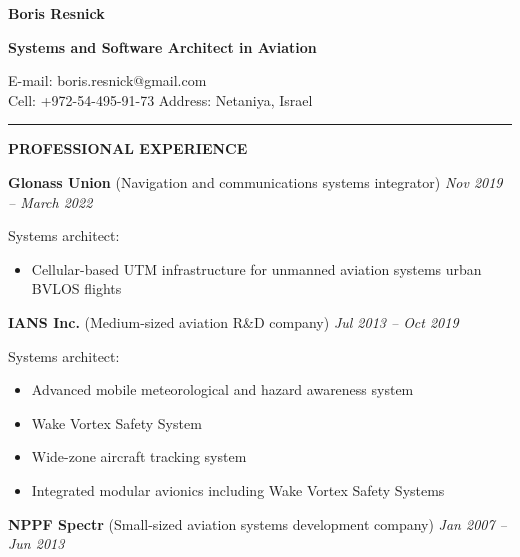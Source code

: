 \documentclass[a4paper]{article}
\begin{document}
    \thispagestyle{empty}
    
	\begin{center}
		{\Large \textbf{Boris Resnick}\par}
		\vspace{2mm}
		{\large \textbf{Systems and Software Architect in A\hspace{-.4mm}viation}\par}
		\vspace{1.5mm}
		E-mail: boris.resnick@gmail.com \vspace{1.5mm} \\
		Cell: +972-54-495-91-73 \quad \quad
		Address: Netaniya, Israel
	\end{center}
	\vspace{-2mm}
	\rule{\textwidth}{1pt}
	\vspace{2mm}

	\textbf{PROFESSIONAL EXPERIENCE}
	\vspace{4mm}

	\textbf{Glonass Union} (Navigation and communications systems integrator) \hfill \textit{Nov 2019 -- March 2022}
	\vspace{1mm}
	
    Systems architect:
	\begin{itemize}
	    \setlength{\itemindent}{.5cm}
	    \item Cellular-based UTM infrastructure for unmanned aviation systems urban BVLOS flights
    \end{itemize}
    \vspace{3mm}
    
    \textbf{IANS Inc.} (Medium-sized aviation R\&D company) \hfill \textit{ Jul 2013 -- Oct 2019}
    \vspace{1mm}
    
    Systems architect:
	\begin{itemize}
	    \setlength{\itemindent}{.5cm}
	    \item Advanced mobile meteorological and hazard awareness system
	    \item Wake Vortex Safety System
	    \item Wide-zone aircraft tracking system
	    \item Integrated modular avionics including Wake Vortex Safety Systems
    \end{itemize}
    \vspace{3mm}
    
    \textbf{NPPF Spectr} (Small-sized aviation systems development company) \hfill \textit{Jan 2007 -- Jun 2013}
    \vspace{1mm}
    
\end{document}

